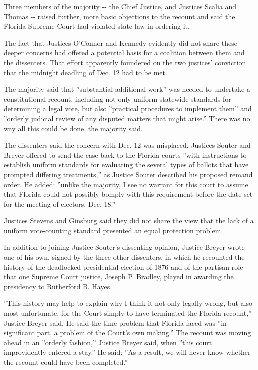 Three members of the majority -\/- the Chief Justice, and Justices
Scalia and Thomas -\/- raised further, more basic objections to the
recount and said the Florida Supreme Court had violated state law in
ordering it.

The fact that Justices O'Connor and Kennedy evidently did not share
these deeper concerns had offered a potential basis for a coalition
between them and the dissenters. That effort apparently foundered on the
two justices' conviction that the midnight deadling of Dec. 12 had to be
met.

The majority said that ''substantial additional work'' was needed to
undertake a constitutional recount, including not only uniform statewide
standards for determining a legal vote, but also ''practical procedures
to implement them'' and ''orderly judicial review of any disputed
matters that might arise.'' There was no way all this could be done, the
majority said.

The dissenters said the concern with Dec. 12 was misplaced. Justices
Souter and Breyer offered to send the case back to the Florida courts
''with instructions to establish uniform standards for evaluating the
several types of ballots that have prompted differing treatments,'' as
Justice Souter described his proposed remand order. He added: ''unlike
the majority, I see no warrant for this court to assume that Florida
could not possibly bomply with this requirement before the date set for
the meeting of electors, Dec. 18.''

Justices Stevens and Ginsburg said they did not share the view that the
lack of a uniform vote-counting standard presented an equal protection
problem.

In addition to joining Justice Souter's dissenting opinion, Justice
Breyer wrote one of his own, signed by the three other dissenters, in
which he recounted the history of the deadlocked presidential election
of 1876 and of the partisan role that one Supreme Court justice, Joseph
P. Bradley, played in awarding the presidency to Rutherford B. Hayes.

''This history may help to explain why I think it not only legally
wrong, but also most unfortunate, for the Court simply to have
terminated the Florida recount,'' Justice Breyer said. He said the time
problem that Florida faced was ''in significant part, a problem of the
Court's own making.'' The recount was moving ahead in an ''orderly
fashion,'' Justice Breyer said, when ''this court improvidently entered
a stay.'' He said: ''As a result, we will never know whether the recount
could have been completed.''

